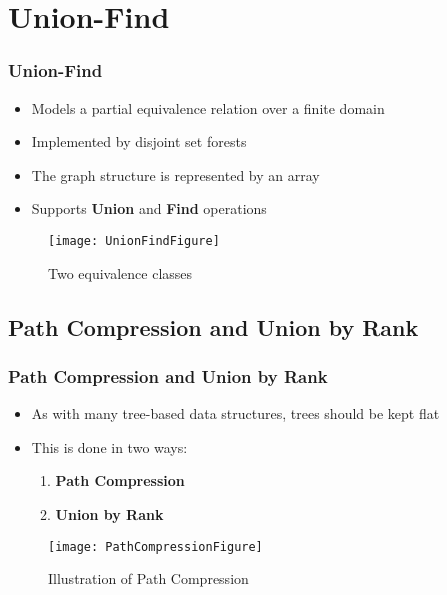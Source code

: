 \section{Union-Find}
\begin{frame}
\frametitle{Union-Find}
\begin{itemize}
	\item Models a partial equivalence relation
over a finite domain
	\item Implemented by disjoint set forests
\item The graph structure is represented by an array
	\item Supports \textbf{Union} and \textbf{Find} operations
\end{itemize}
\vspace{-2cm}
\begin{figure}
	\centering
	\begin{minipage}{5cm}
		\caption{Two equivalence classes}\end{minipage}
	\begin{minipage}{8cm}\texttt{[image: UnionFindFigure]}\end{minipage}
\end{figure}
\end{frame}

\subsection{Path Compression and Union by Rank}
\begin{frame}
\frametitle{Path Compression and Union by Rank}
\begin{itemize}
	\item As with many tree-based data structures, trees should be kept flat
	\item This is done in two ways: 
	\begin{enumerate}
		\item \textbf{Path Compression}
		\item \textbf{Union by Rank}
	\end{enumerate}
\end{itemize}	
\begin{figure}
	\centering
	\begin{minipage}{5cm}
		\caption{Illustration of Path Compression}\end{minipage}
	\begin{minipage}{8cm}\texttt{[image: PathCompressionFigure]}\end{minipage}
\end{figure}
\end{frame}

